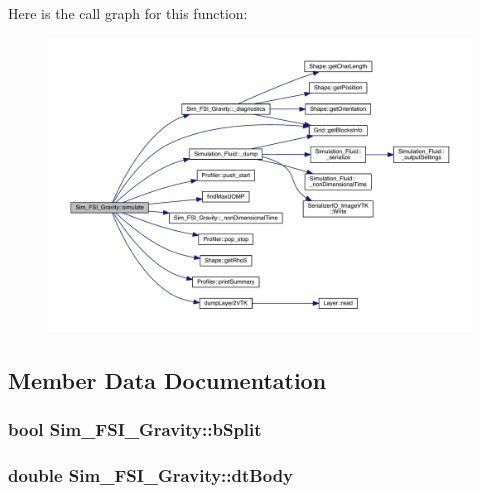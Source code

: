 Here is the call graph for this function\+:
\nopagebreak
\begin{figure}[H]
\begin{center}
\leavevmode
\includegraphics[width=350pt]{d6/de6/class_sim___f_s_i___gravity_add86d6f52de51511f0bb93714fc504c4_cgraph}
\end{center}
\end{figure}




\subsection{Member Data Documentation}
\hypertarget{class_sim___f_s_i___gravity_ab2ec5a560dba9573d0c78325ae6b3661}{}
\subsubsection[{b\+Split}]{\setlength{\rightskip}{0pt plus 5cm}bool Sim\+\_\+\+F\+S\+I\+\_\+\+Gravity\+::b\+Split\hspace{0.3cm}{\ttfamily [protected]}}\label{class_sim___f_s_i___gravity_ab2ec5a560dba9573d0c78325ae6b3661}
\hypertarget{class_sim___f_s_i___gravity_aa5eb5526dc487939dc0ef241e904481c}{}
\subsubsection[{dt\+Body}]{\setlength{\rightskip}{0pt plus 5cm}double Sim\+\_\+\+F\+S\+I\+\_\+\+Gravity\+::dt\+Body\hspace{0.3cm}{\ttfamily [protected]}}\label{class_sim___f_s_i___gravity_aa5eb5526dc487939dc0ef241e904481c}
\hypertarget{class_sim___f_s_i___gravity_acb747fc432b79e9f03348d74bcc929d0}{}
